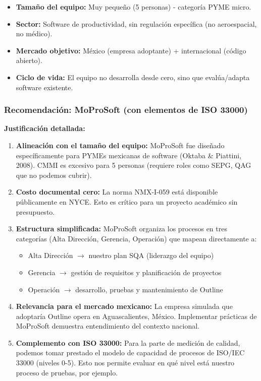 \documentclass[12pt]{article}
\begin{document}
\begin{itemize}
    \item \textbf{Tamaño del equipo:} Muy pequeño (5 personas) - categoría PYME micro.
    \item \textbf{Sector:} Software de productividad, sin regulación específica (no aeroespacial, no médico).
    \item \textbf{Mercado objetivo:} México (empresa adoptante) + internacional (código abierto).
    \item \textbf{Ciclo de vida:} El equipo no desarrolla desde cero, sino que evalúa/adapta software existente.
\end{itemize}

\subsubsection{Recomendación: MoProSoft (con elementos de ISO 33000)}

\textbf{Justificación detallada:}

\begin{enumerate}
    \item \textbf{Alineación con el tamaño del equipo:} MoProSoft fue diseñado específicamente para PYMEs mexicanas de software (Oktaba \& Piattini, 2008). CMMI es excesivo para 5 personas (requiere roles como SEPG, QAG que no podemos cubrir).
    
    \item \textbf{Costo documental cero:} La norma NMX-I-059 está disponible públicamente en NYCE. Esto es crítico para un proyecto académico sin presupuesto.
    
    \item \textbf{Estructura simplificada:} MoProSoft organiza los procesos en tres categorías (Alta Dirección, Gerencia, Operación) que mapean directamente a:
    \begin{itemize}
        \item Alta Dirección $\rightarrow$ nuestro plan SQA (liderazgo del equipo)
        \item Gerencia $\rightarrow$ gestión de requisitos y planificación de proyectos
        \item Operación $\rightarrow$ desarrollo, pruebas y mantenimiento de Outline
    \end{itemize}
    
    \item \textbf{Relevancia para el mercado mexicano:} La empresa simulada que adoptaría Outline opera en Aguascalientes, México. Implementar prácticas de MoProSoft demuestra entendimiento del contexto nacional.
    
    \item \textbf{Complemento con ISO 33000:} Para la parte de medición de calidad, podemos tomar prestado el modelo de capacidad de procesos de ISO/IEC 33000 (niveles 0-5). Esto nos permite evaluar en qué nivel está nuestro proceso de pruebas, por ejemplo.
\end{enumerate}
\end{document}
